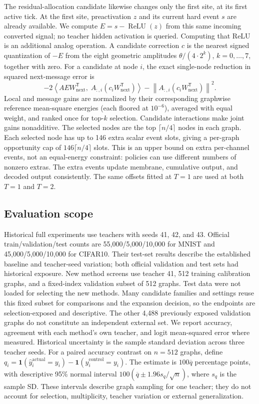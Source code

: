 \documentclass{article}
\begin{document}
The residual-allocation candidate likewise changes only the first site, at its first active tick. At the first site, preactivation $z$ and its current hard event $s$ are already available. We compute $E=s-\operatorname{ReLU}(z)$ from this same incoming converted signal; no teacher hidden activation is queried. Computing that ReLU is an additional analog operation. A candidate correction $c$ is the nearest signed quantization of $-E$ from the eight geometric amplitudes $\theta/(4\cdot 2^k)$, $k=0,\ldots,7$, together with zero. For a candidate at node $i$, the exact single-node reduction in squared next-message error is
\[
-2\left\langle A E W_{\mathrm{next}}^{\mathsf T},\; A_{:,i}(c_iW_{\mathrm{next}}^{\mathsf T})\right\rangle
-\left\|A_{:,i}(c_iW_{\mathrm{next}}^{\mathsf T})\right\|^2.
\]
Local and message gains are normalized by their corresponding graphwise reference mean-square energies (each floored at $10^{-6}$), averaged with equal weight, and ranked once for top-$k$ selection. Candidate interactions make joint gains nonadditive. The selected nodes are the top $\lceil n/4\rceil$ nodes in each graph. Each selected node has up to 146 extra scalar event slots, giving a per-graph opportunity cap of $146\lceil n/4\rceil$ slots. This is an upper bound on extra per-channel events, not an equal-energy constraint: policies can use different numbers of nonzero extras. The extra events update membrane, cumulative output, and decoded output consistently. The same offsets fitted at $T=1$ are used at both $T=1$ and $T=2$.

\subsection{Evaluation scope}

\label{sec:evaluation_scope}

Historical full experiments use teachers with seeds 41, 42, and 43. Official train/validation/test counts are 55,000/5,000/10,000 for MNIST and 45,000/5,000/10,000 for CIFAR10. Their test-set results describe the established baseline and teacher-seed variation; both official validation and test sets had historical exposure. New method screens use teacher 41, 512 training calibration graphs, and a fixed-index validation subset of 512 graphs. Test data were not loaded for selecting the new methods. Many candidate families and settings reuse this fixed subset for comparisons and the expansion decision, so the endpoints are selection-exposed and descriptive. The other 4,488 previously exposed validation graphs do not constitute an independent external set. We report accuracy, agreement with each method's own teacher, and logit mean-squared error where measured. Historical uncertainty is the sample standard deviation across three teacher seeds. For a paired accuracy contrast on $n=512$ graphs, define $q_i=\mathbf{1}(\hat y_i^{\mathrm{actual}}=y_i)-\mathbf{1}(\hat y_i^{\mathrm{control}}=y_i)$. The estimate is $100\overline q$ percentage points, with descriptive 95\% normal interval $100(\overline q\pm1.96s_q/\sqrt n)$, where $s_q$ is the sample SD. These intervals describe graph sampling for one teacher; they do not account for selection, multiplicity, teacher variation or external generalization.
\end{document}
